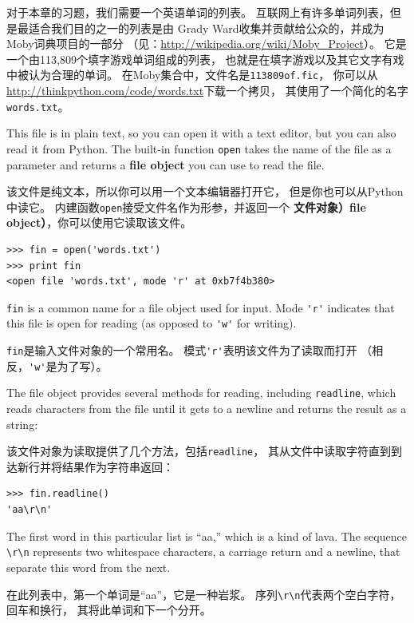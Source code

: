 \documentclass[10pt]{book}
\begin{document}
\begin{CJK}{UTF8}{gbsn}
对于本章的习题，我们需要一个英语单词的列表。
互联网上有许多单词列表，但是最适合我们目的之一的列表是由
Grady Ward收集并贡献给公众的，并成为Moby词典项目的一部分
（见：\url{http://wikipedia.org/wiki/Moby_Project}）。
它是一个由113,809个填字游戏单词组成的列表，
也就是在填字游戏以及其它文字有戏中被认为合理的单词。
在Moby集合中，文件名是{\tt 113809of.fic}，
你可以从\url{http://thinkpython.com/code/words.txt}下载一个拷贝，
其使用了一个简化的名字{\tt words.txt}。

This file is in plain text, so you can open it with a text
editor, but you can also read it from Python.  The built-in
function {\tt open} takes the name of the file as a parameter
and returns a {\bf file object} you can use to read the file.

该文件是纯文本，所以你可以用一个文本编辑器打开它，
但是你也可以从Python中读它。
内建函数{\tt open}接受文件名作为形参，并返回一个
{\bf 文件对象）file object）}，你可以使用它读取该文件。

\begin{verbatim}
>>> fin = open('words.txt')
>>> print fin
<open file 'words.txt', mode 'r' at 0xb7f4b380>
\end{verbatim}
%
{\tt fin} is a common name for a file object used for
input.  Mode \verb"'r'" indicates that this file is open for
reading (as opposed to \verb"'w'" for writing).

{\tt fin}是输入文件对象的一个常用名。
模式\verb"'r'"表明该文件为了读取而打开
（相反，\verb"'w'"是为了写）。

The file object provides several methods for reading, including
{\tt readline}, which reads characters from the file
until it gets to a newline and returns the result as a
string:

该文件对象为读取提供了几个方法，包括{\tt readline}，
其从文件中读取字符直到到达新行并将结果作为字符串返回：

\begin{verbatim}
>>> fin.readline()
'aa\r\n'
\end{verbatim}
%
The first word in this particular list is ``aa,'' which is a kind of
lava.  The sequence \verb"\r\n" represents two whitespace characters,
a carriage return and a newline, that separate this word from the
next.

在此列表中，第一个单词是``aa''，它是一种岩浆。
序列\verb"\r\n"代表两个空白字符，回车和换行，
其将此单词和下一个分开。


\end{CJK}
\end{document}
